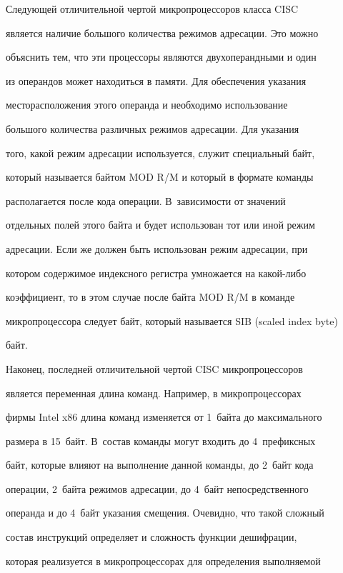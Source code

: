 Следующей отличительной чертой микропроцессоров класса CISC 


является наличие большого количества режимов адресации. Это можно 


объяснить тем, что эти процессоры являются двухоперандными и один 


из операндов может находиться в памяти. Для обеспечения указания 


месторасположения этого операнда и необходимо использование 


большого количества различных режимов адресации.  Для указания 


того, какой режим адресации используется, служит специальный байт, 


который называется байтом MOD R/M и который в формате команды 


располагается после кода операции. В~зависимости от значений 


отдельных полей этого байта и будет использован тот или иной режим 


адресации. Если же должен быть использован режим адресации, при 


котором содержимое индексного регистра умножается на ка\-кой-ли\-бо 


коэффициент, то в этом случае после байта MOD R/M в команде 


микропроцессора следует  байт, который называется SIB (scaled index byte)


байт. 





Наконец, последней отличительной чертой CISC микропроцессоров 


является переменная длина команд.  Например, в микропроцессорах 


фирмы Intel  x86 длина команд изменяется от 1~байта до максимального 


размера в 15~байт.  В~состав команды могут входить до 4~префиксных 


байт, которые влияют на выполнение данной команды, до 2~байт кода 


операции, 2~байта режимов адресации, до 4~байт непосредственного 


операнда и до 4~байт указания смещения. Очевидно, что такой сложный 


состав инструкций определяет и сложность функции дешифрации, 


которая реализуется в микропроцессорах для определения выполняемой 


